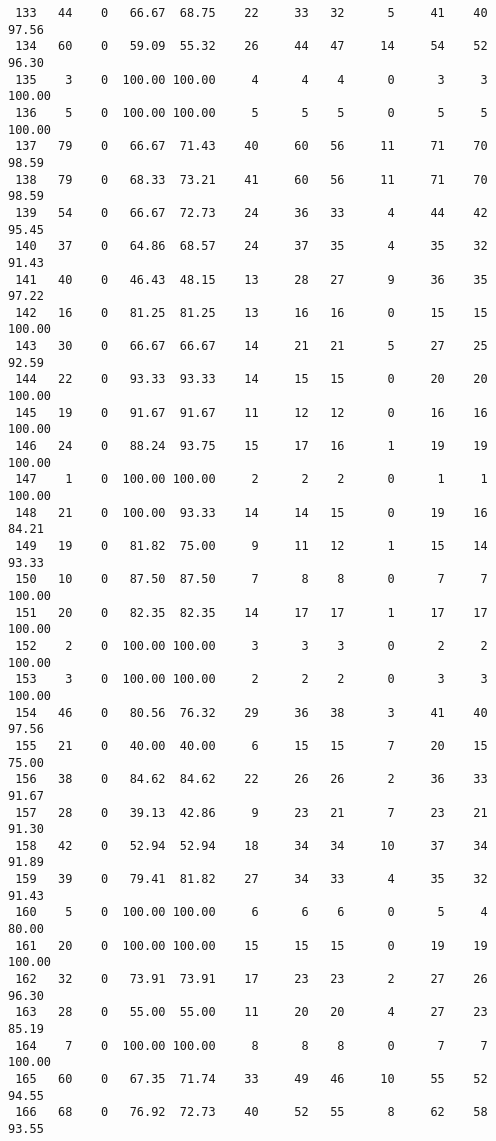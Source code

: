 \begin{verbatim}
 133   44    0   66.67  68.75    22     33   32      5     41    40    97.56
 134   60    0   59.09  55.32    26     44   47     14     54    52    96.30
 135    3    0  100.00 100.00     4      4    4      0      3     3   100.00
 136    5    0  100.00 100.00     5      5    5      0      5     5   100.00
 137   79    0   66.67  71.43    40     60   56     11     71    70    98.59
 138   79    0   68.33  73.21    41     60   56     11     71    70    98.59
 139   54    0   66.67  72.73    24     36   33      4     44    42    95.45
 140   37    0   64.86  68.57    24     37   35      4     35    32    91.43
 141   40    0   46.43  48.15    13     28   27      9     36    35    97.22
 142   16    0   81.25  81.25    13     16   16      0     15    15   100.00
 143   30    0   66.67  66.67    14     21   21      5     27    25    92.59
 144   22    0   93.33  93.33    14     15   15      0     20    20   100.00
 145   19    0   91.67  91.67    11     12   12      0     16    16   100.00
 146   24    0   88.24  93.75    15     17   16      1     19    19   100.00
 147    1    0  100.00 100.00     2      2    2      0      1     1   100.00
 148   21    0  100.00  93.33    14     14   15      0     19    16    84.21
 149   19    0   81.82  75.00     9     11   12      1     15    14    93.33
 150   10    0   87.50  87.50     7      8    8      0      7     7   100.00
 151   20    0   82.35  82.35    14     17   17      1     17    17   100.00
 152    2    0  100.00 100.00     3      3    3      0      2     2   100.00
 153    3    0  100.00 100.00     2      2    2      0      3     3   100.00
 154   46    0   80.56  76.32    29     36   38      3     41    40    97.56
 155   21    0   40.00  40.00     6     15   15      7     20    15    75.00
 156   38    0   84.62  84.62    22     26   26      2     36    33    91.67
 157   28    0   39.13  42.86     9     23   21      7     23    21    91.30
 158   42    0   52.94  52.94    18     34   34     10     37    34    91.89
 159   39    0   79.41  81.82    27     34   33      4     35    32    91.43
 160    5    0  100.00 100.00     6      6    6      0      5     4    80.00
 161   20    0  100.00 100.00    15     15   15      0     19    19   100.00
 162   32    0   73.91  73.91    17     23   23      2     27    26    96.30
 163   28    0   55.00  55.00    11     20   20      4     27    23    85.19
 164    7    0  100.00 100.00     8      8    8      0      7     7   100.00
 165   60    0   67.35  71.74    33     49   46     10     55    52    94.55
 166   68    0   76.92  72.73    40     52   55      8     62    58    93.55

\end{verbatim}
